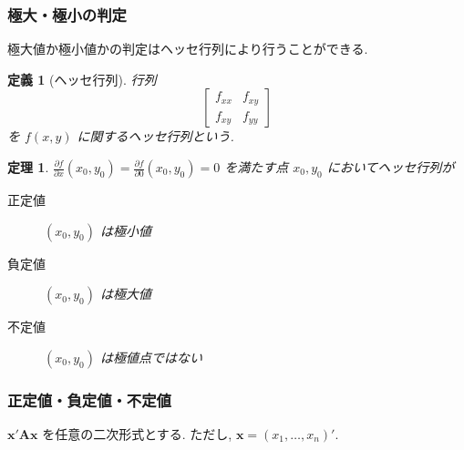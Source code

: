 \documentclass{jsarticle}
\theoremstyle{plain}
\newtheorem{theo}{定理}[section]
\newtheorem{defi}{定義}[section]
\begin{document}
  \subsubsection{極大・極小の判定}
  極大値か極小値かの判定はヘッセ行列により行うことができる.

  \begin{defi}[ヘッセ行列]
    行列
    \begin{equation*}
      \left[
        \begin{array}{cc}
          f_{xx} & f_{xy} \\
          f_{xy} & f_{yy}
        \end{array}
      \right]
    \end{equation*}
    を $f(x, y)$ に関するヘッセ行列という.
  \end{defi}

  \begin{theo}
    $\frac{\partial f}{\partial x}(x_0, y_0) = \frac{\partial f}{\partial 0}(x_0, y_0) = 0$ を満たす点 $x_0, y_0$ においてヘッセ行列が\footnotemark
    \begin{description}
      \item[正定値] $(x_0, y_0)$ は極小値
      \item[負定値] $(x_0, y_0)$ は極大値
      \item[不定値] $(x_0, y_0)$ は極値点ではない
    \end{description}
  \end{theo}

  \subsubsection{正定値・負定値・不定値}
  $\bm{x}'\bm{A}\bm{x}$ を任意の二次形式とする. ただし, $\bm{x} = (x_1, \ldots, x_n)'$.
  
\end{document}
